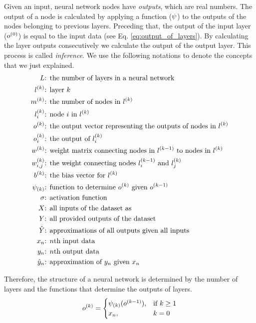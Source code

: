 Given an input, neural network nodes have \textit{outputs}, which are real numbers. The output of a node is calculated by applying a function ($\psi$) to the outputs of the nodes belonging to previous layers. Preceding that, the output of the input layer ($o^{(0)}$) is equal to the input data (see Eq. \ref{eq:output_of_layers}).  By calculating the layer outputs consecutively we calculate the output of the output layer. This process is called \textit{inference}. We use the following notations to denote the concepts that we just explained.
\begin{equation*}
\begin{split}
\num\layer & \text{: the number of layers in a neural network}\\
\lk{k} & \text{: layer $k$}\\
\mk{k} & \text{: the number of nodes in $\lk{k}$}\\
\lki{k}{i}  & \text{: node $i$ in $\lk{k}$}\\
\ok{k}  & \text{: the output vector representing the outputs of nodes in $\lk{k}$}\\
\oki{k}{i}  & \text{: the output of $\lki{k}{i}$}\\
\wk{k}  & \text{: weight matrix connecting nodes in $\lk{k-1}$ to nodes in $\lk{k}$} \\
\wki{k}{i,j}  & \text{: the weight connecting nodes $\lki{k-1}{i}$ and $\lki{k}{j}$} \\
\bk{k}  & \text{: the bias vector for $\lk{k}$} \\
\lfk{k} & \text{: function to determine $\ok{k}$ given $\ok{k-1}$}\\
\act & \text{: activation function} \\
\all\x & \text{: all inputs of the dataset as}\\
\all\y & \text{: all provided outputs of the dataset} \\
\all\yh & \text{: approximations of all outputs given all inputs}  \\
\xn{n} & \text{: $n$th input data} \\
\yn{n} & \text{: $n$th output data} \\
\yhn{n} & \text{: approximation of $\yn{n}$ given $\xn{n}$}
\end{split}
\end{equation*}

Therefore, the structure of a neural network is determined by the number of layers and the functions that determine the outputs of layers.
\begin{equation}
\label{eq:output_of_layers}
    o^{(k)} = 
\begin{cases}
    \psi_{(k)}(o^{(k-1)}), &\text{if } k\geq 1\\
    x_{n},& k = 0\\
\end{cases}
\end{equation}


